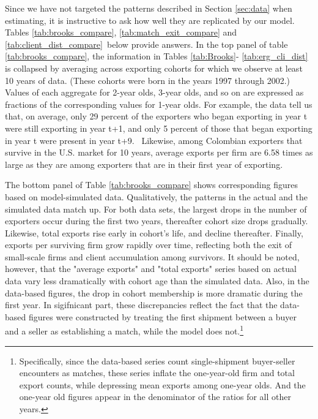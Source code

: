 \documentclass[12pt]{article}
\begin{document}
Since we have not targeted the patterns described in Section \ref{sec:data}
when estimating, it is instructive to ask how well they are replicated by
our model. Tables \ref{tab:brooks_compare}, \ref{tab:match_exit_compare} and %
\ref{tab:client_dist_compare}\ below provide answers. In the top panel of
table \ref{tab:brooks_compare}, the information in Tables \ref{tab:Brooks}-%
\ref{tab:erg_cli_dist} is collapsed by averaging across exporting cohorts
for which we observe at least 10 years of data. (These cohorts were born in
the years 1997 through 2002.) Values of each aggregate for 2-year olds,
3-year olds, and so on are expressed as fractions of the corresponding
values for 1-year olds. For example, the data tell us that, on average, only
29 percent of the exporters who began exporting in year t were still
exporting in year t+1, and only 5 percent of those that began exporting in
year t were present in year t+9. \ Likewise, among Colombian exporters that
survive in the U.S. market for 10 years, average exports per firm are 6.58
times as large as they are among exporters that are in their first year of
exporting.

The bottom panel of Table \ref{tab:brooks_compare} shows corresponding
figures based on model-simulated data. Qualitatively, the patterns in the
actual and the simulated data match up. For both data sets, the largest
drops in the number of exporters occur during the first two years,
thereafter cohort size drops gradually. Likewise, total exports rise early
in cohort's life, and decline thereafter. Finally, exports per surviving
firm grow rapidly over time, reflecting both the exit of small-scale firms
and client accumulation among survivors. It should be noted, however, that
the "average exports" and "total exports" series based on actual data vary
less dramatically with cohort age than the simulated data. Also, in the
data-based figures, the drop in cohort membership is more dramatic during
the first year. In sigifnicant part, these discrepancies reflect the fact
that the data-based figures were constructed by treating the first shipment
between a buyer and a seller as establishing a match, while the model does
not.\footnote{%
Specifically, since the data-based series count single-shipment buyer-seller
encounters as matches, these series inflate the one-year-old firm and total
export counts, while depressing mean exports among one-year olds. And the
one-year old figures appear in the denominator of the ratios for all other
years.}
\end{document}
